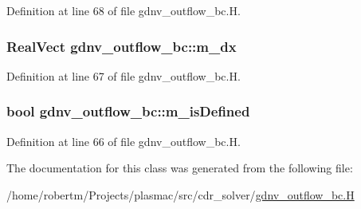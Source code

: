 Definition at line 68 of file gdnv\+\_\+outflow\+\_\+bc.\+H.

\subsubsection[{\texorpdfstring{m\+\_\+dx}{m_dx}}]{\setlength{\rightskip}{0pt plus 5cm}Real\+Vect gdnv\+\_\+outflow\+\_\+bc\+::m\+\_\+dx\hspace{0.3cm}{\ttfamily [protected]}}\hypertarget{classgdnv__outflow__bc_a0ce3be60e98f4d5052fcca31f8f01b8c}{}\label{classgdnv__outflow__bc_a0ce3be60e98f4d5052fcca31f8f01b8c}


Definition at line 67 of file gdnv\+\_\+outflow\+\_\+bc.\+H.

\subsubsection[{\texorpdfstring{m\+\_\+is\+Defined}{m_isDefined}}]{\setlength{\rightskip}{0pt plus 5cm}bool gdnv\+\_\+outflow\+\_\+bc\+::m\+\_\+is\+Defined\hspace{0.3cm}{\ttfamily [protected]}}\hypertarget{classgdnv__outflow__bc_a8837764ac6a880aa10ad1da8ea54b445}{}\label{classgdnv__outflow__bc_a8837764ac6a880aa10ad1da8ea54b445}


Definition at line 66 of file gdnv\+\_\+outflow\+\_\+bc.\+H.



The documentation for this class was generated from the following file\+:\begin{DoxyCompactItemize}
\item 
/home/robertm/\+Projects/plasmac/src/cdr\+\_\+solver/\hyperlink{gdnv__outflow__bc_8H}{gdnv\+\_\+outflow\+\_\+bc.\+H}\end{DoxyCompactItemize}
